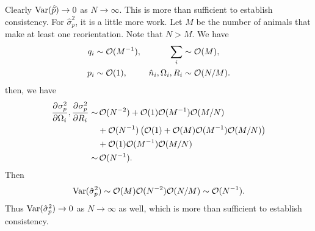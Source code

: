 \documentclass[12pt]{article}
\begin{document}
Clearly $\operatorname{Var}(\hat{\bar{p}})\to0$ as $N\to\infty$. This is more than sufficient to establish consistency. For $\hat{\sigma}_p^2$, it is a little more work. Let $M$ be the number of animals that make at least one reorientation. Note that $N>M$. We have
%
\begin{equation}\label{eq:orderNM}
  \begin{aligned}
    q_i &\sim \mathcal{O}(M^{-1}),
    & \sum_i &\sim \mathcal{O}(M), \\
    p_i &\sim \mathcal{O}(1),
    & \hat{n}_i,\Omega_i,R_i &\sim \mathcal{O}(N/M).
  \end{aligned}
\end{equation}
%
then, we have
%
\begin{equation}\label{eq:coefforder}
  \begin{aligned}
    \pdiff{\sigma_p^2}{\Omega_i},\pdiff{\sigma_p^2}{R_i}  \sim&\,
    \CO(N^{-2}) + \CO(1)\CO(M^{-1})\CO(M/N) \\&+ \CO(N^{-1})\prn{\CO(1) + \CO(M)\CO(M^{-1})\CO(M/N)} \\&+ \CO(1)\CO(M^{-1})\CO(M/N)\\
      \sim&\, \CO(N^{-1}).
  \end{aligned}
\end{equation}
%
Then
%
\begin{equation}\label{eq:ordervarvarp}
  \operatorname{Var}(\hat{\sigma}_p^2) \sim \mathcal{O}(M)\mathcal{O}(N^{-2})\mathcal{O}(N/M) \sim \mathcal{O}(N^{-1}).
\end{equation}
%
Thus $\operatorname{Var}(\hat{\sigma}_p^2)\to0$ as $N\to\infty$ as well, which is more than sufficient to establish consistency.












\end{document}
